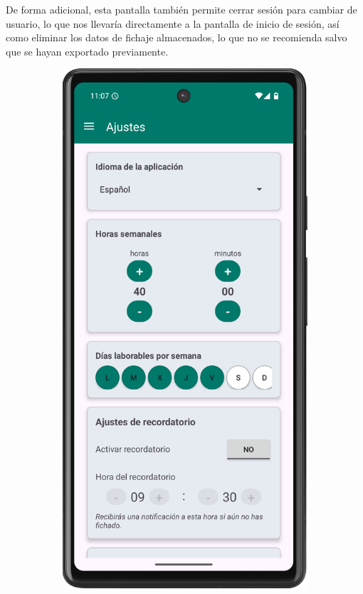 De forma adicional, esta pantalla también permite cerrar sesión para cambiar de usuario, lo que nos llevaría directamente a la pantalla de inicio de sesión, así como eliminar los datos de fichaje almacenados, lo que no se recomienda salvo que se hayan exportado previamente.

\begin{figure}[H]
     \centering
     \begin{subfigure}[b]{0.3\textwidth}
         \centering
         \includegraphics[width=\textwidth]{root/settings-1.png}

\end{subfigure}
\end{figure}
